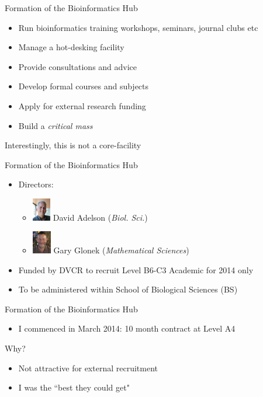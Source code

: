 \documentclass[11pt]{beamer}
\begin{document}
\begin{frame}{Formation of the Bioinformatics Hub}

	\begin{itemize}
		\item Run bioinformatics training workshops, seminars, journal clubs etc
		\item Manage a hot-desking facility
		\item Provide consultations and advice
		\item Develop formal courses and subjects
		\item Apply for external research funding
		\item Build a \textit{critical mass}
	\end{itemize}
	
	\pause
	Interestingly, this is not a core-facility\\[5mm]

\end{frame}

\begin{frame}{Formation of the Bioinformatics Hub}

	\begin{itemize}
		\item Directors: 
		\begin{itemize}
			\item \includegraphics[height=1cm]{figures/dave.jpg} David Adelson (\textit{Biol. Sci.})
			\item \includegraphics[height=1cm]{figures/gary.jpg} Gary Glonek (\textit{Mathematical Sciences})
		\end{itemize}			
		\item Funded by DVCR to recruit Level B6-C3 Academic for 2014 only
		\item To be administered within School of Biological Sciences (BS)\\[1cm]

	\end{itemize}	
	
\end{frame}

\begin{frame}{Formation of the Bioinformatics Hub}
	
	\begin{itemize}
		\item I commenced in March 2014: 10 month contract at Level A4
	\end{itemize}
	Why?
	\pause
	\begin{itemize}
		\item Not attractive for external recruitment
		\item I was the ``best they could get"\\[2cm]
	\end{itemize}
	
\end{frame}
\end{document}
